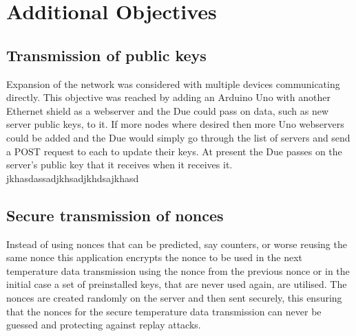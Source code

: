 \section{Additional Objectives}

\subsection{Transmission of public keys}

Expansion of the network was considered with multiple devices communicating directly. This objective was reached by adding an Arduino Uno with another Ethernet shield as a webserver and the Due could pass on data, such as new server public keys, to it. If more nodes where desired then more Uno webservers could be added and the Due would simply go through the list of servers and send a POST request to each to update their keys. At present the Due passes on the server's public key that it receives when it receives it.  jkhasdassadjkhsadjkhdsajkhasd

\subsection{Secure transmission of nonces}

Instead of using nonces that can be predicted, say counters, or worse reusing the same nonce this application encrypts the nonce to be used in the next temperature data transmission using the nonce from the previous nonce or in the initial case a set of preinstalled keys, that are never used again, are utilised. The nonces are created randomly on the server and then sent securely, this ensuring that the nonces for the secure temperature data transmission can never be guessed and protecting against replay attacks.

